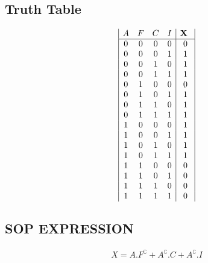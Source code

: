 \documentclass{article}
\begin{document}
\subsection{Truth Table}
\begin{displaymath}
\begin{array}{|c c c c |c|}
A & F & C &I &\textbf{X } \\ %
\hline %
0 & 0 & 0 & 0 & 0 \\
0 & 0 & 0 & 1 & 1 \\
0 & 0 & 1 & 0 & 1 \\
0 & 0 & 1 & 1 & 1 \\
0 & 1 & 0 & 0 & 0 \\
0 & 1 & 0 & 1 & 1 \\
0 & 1 & 1 & 0 & 1 \\
0 & 1 & 1 & 1 & 1 \\
1 & 0 & 0 & 0 & 1 \\
1 & 0 & 0 & 1 & 1 \\
1 & 0 & 1 & 0 & 1 \\
1 & 0 & 1 & 1 & 1 \\
1 & 1 & 0 & 0 & 0 \\
1 & 1 & 0 & 1 & 0 \\
1 & 1 & 1 & 0 & 0 \\
1 & 1 & 1 & 1 & 0 \\



\end{array}
\end{displaymath}

\subsection{SOP EXPRESSION}
      \begin{align}
         X=A.F^\complement +A^\complement.C +A^\complement.I 
      \end{align}     
      
   
\end{document}
